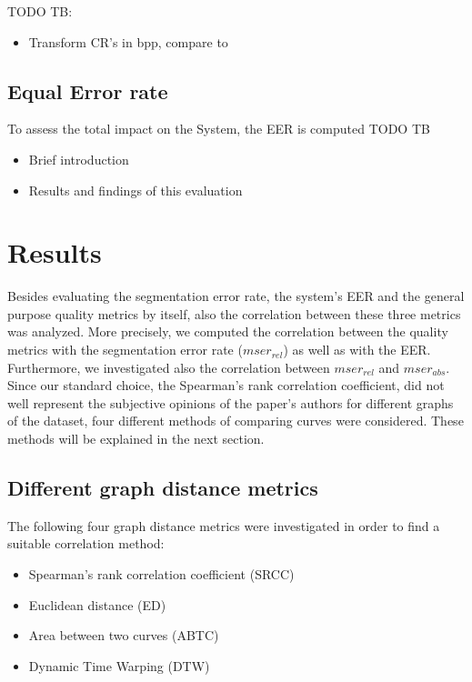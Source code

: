 \documentclass[10pt,twocolumn,letterpaper]{article}
\begin{document}
TODO TB:
\begin{itemize}
 \item Transform CR's in bpp, compare to \cite{severeCompression}
\end{itemize}


\subsection{Equal Error rate}
To assess the total impact on the System, the EER is computed
TODO TB

\begin{itemize}
 \item Brief introduction
 \item Results and findings of this evaluation
\end{itemize}


\section{Results}
\label{section:results}
Besides evaluating the segmentation error rate, the system’s EER and the general purpose quality metrics by itself, also the correlation between these three metrics was analyzed. More precisely, we computed the correlation between the quality metrics with the segmentation error rate ($mser_{rel}$) as well as with the EER. Furthermore, we investigated also the correlation between $mser_{rel}$ and $mser_{abs}$.
Since our standard choice, the Spearman’s rank correlation coefficient, did not well represent the subjective opinions of the paper’s authors for different graphs of the dataset, four different methods of comparing curves were considered. These methods will be explained in the next section.


\subsection{Different graph distance metrics}
The following four graph distance metrics were investigated in order to find a suitable correlation method:
\begin{itemize}
\item Spearman’s rank correlation coefficient (SRCC)
\item Euclidean distance (ED)
\item Area between two curves (ABTC)
\item Dynamic Time Warping (DTW)
\end{itemize}
\end{document}
